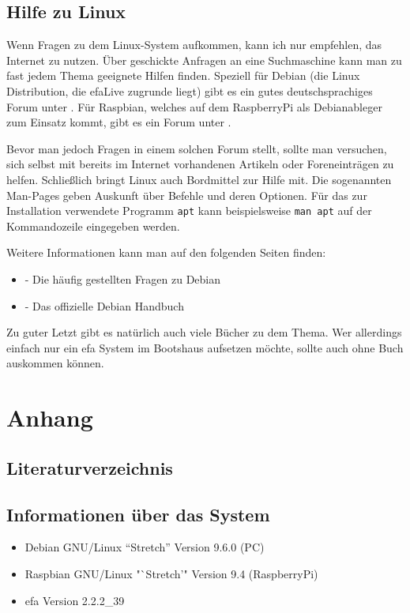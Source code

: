 \documentclass[a4paper,12pt,twoside]{article}
\begin{document}
\subsection{Hilfe zu Linux}
\label{sct:hilfe_linux}
Wenn Fragen zu dem Linux-System aufkommen, kann ich nur empfehlen, das
Internet zu nutzen. Über geschickte Anfragen an eine Suchmaschine kann
man zu fast jedem Thema geeignete Hilfen finden. Speziell für Debian
(die Linux Distribution, die efaLive zugrunde liegt) gibt es ein gutes
deutschsprachiges Forum unter \cite{HLP1}. Für Raspbian, welches auf 
dem RaspberryPi als Debianableger zum Einsatz kommt, gibt es ein Forum 
unter \cite{RSP1}.

Bevor man jedoch Fragen in
einem solchen Forum stellt, sollte man versuchen, sich selbst mit
bereits im Internet vorhandenen Artikeln oder Foreneinträgen zu helfen.
Schließlich bringt Linux auch Bordmittel zur Hilfe mit. Die sogenannten
Man-Pages geben Auskunft über Befehle und deren Optionen. Für das zur
Installation verwendete Programm \texttt{apt}
kann beispielsweise \texttt{man apt} auf der
Kommandozeile eingegeben werden.

Weitere Informationen kann man auf den folgenden Seiten finden:

\begin{itemize}
    \item \cite{HLP2} - Die häufig gestellten Fragen zu Debian
    \item \cite{HLP3} - Das offizielle Debian Handbuch
\end{itemize}

Zu guter Letzt gibt es natürlich auch viele Bücher zu dem Thema. Wer
allerdings einfach nur ein efa System im Bootshaus aufsetzen möchte,
sollte auch ohne Buch auskommen können.


\clearpage
\section{Anhang}
\label{sct:anhang}
\subsection{Literaturverzeichnis}
\label{sct:literatur}




\subsection{Informationen über das System}
\label{sct:sysinfo}

\begin{itemize}
    \item Debian GNU/Linux "`Stretch"' Version 9.6.0 (PC)
    \item Raspbian GNU/Linux "`Stretch'" Version 9.4 (RaspberryPi)
    \item efa Version 2.2.2\_39
\end{itemize}
\end{document}
